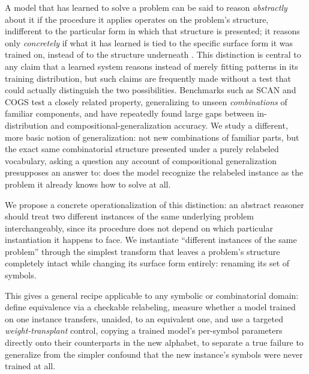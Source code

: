 \documentclass{article} %
\begin{document}
A model that has learned to solve a problem can be said to reason
\emph{abstractly} about it if the procedure it applies operates on the
problem's structure, indifferent to the particular form in which that
structure is presented; it reasons only \emph{concretely} if what it has
learned is tied to the specific surface form it was trained on, instead
of to the structure underneath \citep{fodor1988connectionism}. This distinction is central to any claim
that a learned system reasons instead of merely fitting patterns in its
training distribution, but such claims are frequently made without a
test that could actually distinguish the two possibilities. Benchmarks
such as SCAN \citep{lake2018generalization} and COGS \citep{kim2020cogs}
test a closely related property, generalizing to unseen
\emph{combinations} of familiar components, and have repeatedly found
large gaps between in-distribution and compositional-generalization
accuracy. We study a different, more basic notion of generalization: not
new combinations of familiar parts, but the exact same combinatorial
structure presented under a purely relabeled vocabulary, asking a
question any account of compositional generalization presupposes an
answer to: does the model recognize the relabeled instance as the
problem it already knows how to solve at all.

We propose a concrete operationalization of this distinction: an
abstract reasoner should treat two different instances of the same
underlying problem interchangeably, since its procedure does not depend
on which particular instantiation it happens to face. We instantiate
``different instances of the same problem'' through the simplest
transform that leaves a problem's structure completely intact while
changing its surface form entirely: renaming its set of symbols.

This gives a general recipe applicable to any symbolic or combinatorial
domain: define equivalence via a checkable relabeling, measure whether a
model trained on one instance transfers, unaided, to an equivalent one,
and use a targeted \emph{weight-transplant} control, copying a trained
model's per-symbol parameters directly onto their counterparts in the
new alphabet, to separate a true failure to generalize from the simpler
confound that the new instance's symbols were never trained at all.
\end{document}
